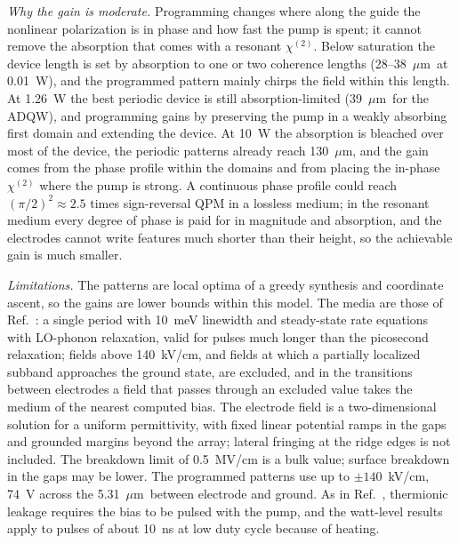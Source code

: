 \documentclass[11pt]{article}
\newcommand{\chitwo}{\chi^{(2)}}
\newcommand{\um}{~$\mu$m}
\begin{document}
\emph{Why the gain is moderate.} Programming changes where along the guide the nonlinear polarization is in phase and how fast the pump is spent; it cannot remove the absorption that comes with a resonant $\chitwo$. Below saturation the device length is set by absorption to one or two coherence lengths (28--38\um\ at 0.01~W), and the programmed pattern mainly chirps the field within this length. At 1.26~W the best periodic device is still absorption-limited (39\um\ for the ADQW), and programming gains by preserving the pump in a weakly absorbing first domain and extending the device. At 10~W the absorption is bleached over most of the device, the periodic patterns already reach 130\um, and the gain comes from the phase profile within the domains and from placing the in-phase $\chitwo$ where the pump is strong. A continuous phase profile could reach $(\pi/2)^2\approx2.5$ times sign-reversal QPM in a lossless medium; in the resonant medium every degree of phase is paid for in magnitude and absorption, and the electrodes cannot write features much shorter than their height, so the achievable gain is much smaller.

\emph{Limitations.} The patterns are local optima of a greedy synthesis and coordinate ascent, so the gains are lower bounds within this model. The media are those of Ref.~\cite{OwnbyN1}: a single period with 10~meV linewidth and steady-state rate equations with LO-phonon relaxation, valid for pulses much longer than the picosecond relaxation; fields above 140~kV/cm, and fields at which a partially localized subband approaches the ground state, are excluded, and in the transitions between electrodes a field that passes through an excluded value takes the medium of the nearest computed bias. The electrode field is a two-dimensional solution for a uniform permittivity, with fixed linear potential ramps in the gaps and grounded margins beyond the array; lateral fringing at the ridge edges is not included. The breakdown limit of 0.5~MV/cm is a bulk value; surface breakdown in the gaps may be lower. The programmed patterns use up to $\pm140$~kV/cm, 74~V across the 5.31\um\ between electrode and ground. As in Ref.~\cite{OwnbyN1}, thermionic leakage requires the bias to be pulsed with the pump, and the watt-level results apply to pulses of about 10~ns at low duty cycle because of heating.
\end{document}

